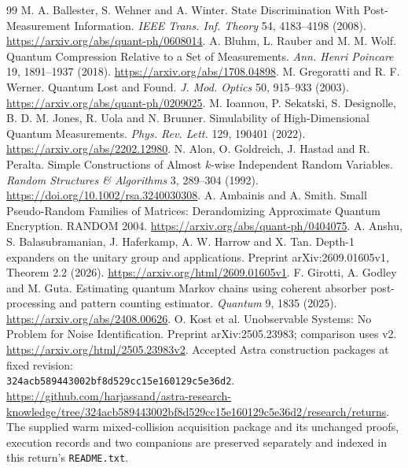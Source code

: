 \documentclass[11pt]{article}
\begin{document}
\begin{thebibliography}{99}\footnotesize
{} M. A. Ballester, S. Wehner and A. Winter.
State Discrimination With Post-Measurement Information.
\emph{IEEE Trans. Inf. Theory} 54, 4183--4198 (2008).
\url{https://arxiv.org/abs/quant-ph/0608014}.
 A. Bluhm, L. Rauber and M. M. Wolf.
Quantum Compression Relative to a Set of Measurements.
\emph{Ann. Henri Poincare} 19, 1891--1937 (2018).
\url{https://arxiv.org/abs/1708.04898}.
 M. Gregoratti and R. F. Werner. Quantum Lost and Found.
\emph{J. Mod. Optics} 50, 915--933 (2003).
\url{https://arxiv.org/abs/quant-ph/0209025}.
 M. Ioannou, P. Sekatski, S. Designolle,
B. D. M. Jones, R. Uola and N. Brunner.
Simulability of High-Dimensional Quantum Measurements.
\emph{Phys. Rev. Lett.} 129, 190401 (2022).
\url{https://arxiv.org/abs/2202.12980}.
 N. Alon, O. Goldreich, J. Hastad and R. Peralta.
Simple Constructions of Almost $k$-wise Independent Random Variables.
\emph{Random Structures \& Algorithms} 3, 289--304 (1992).
\url{https://doi.org/10.1002/rsa.3240030308}.
 A. Ambainis and A. Smith.
Small Pseudo-Random Families of Matrices: Derandomizing Approximate Quantum
Encryption. RANDOM 2004.
\url{https://arxiv.org/abs/quant-ph/0404075}.
 A. Anshu, S. Balasubramanian, J. Haferkamp, A. W. Harrow
and X. Tan. Depth-1 expanders on the unitary group and applications.
Preprint arXiv:2609.01605v1, Theorem 2.2 (2026).
\url{https://arxiv.org/html/2609.01605v1}.
 F. Girotti, A. Godley and M. Guta.
Estimating quantum Markov chains using coherent absorber post-processing
and pattern counting estimator. \emph{Quantum} 9, 1835 (2025).
\url{https://arxiv.org/abs/2408.00626}.
 O. Kost et al. Unobservable Systems: No Problem for Noise
Identification. Preprint arXiv:2505.23983; comparison uses v2.
\url{https://arxiv.org/html/2505.23983v2}.
 Accepted Astra construction packages at fixed revision:\\
{\small\texttt{324acb589443002bf8d529cc15e160129c5e36d2}}.
\url{https://github.com/harjassand/astra-research-knowledge/tree/324acb589443002bf8d529cc15e160129c5e36d2/research/returns}.
The supplied warm mixed-collision acquisition package and its unchanged
proofs, execution records and two companions are preserved separately and
indexed in this return's \texttt{README.txt}.
\end{thebibliography}
\end{document}
